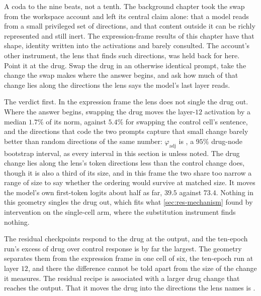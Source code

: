 
\begin{question}
A coda to the nine beats, not a tenth. The background chapter took the swap from
the workspace account and left its central claim alone: that a model reads from
a small privileged set of directions, and that content outside it can be richly
represented and still inert. The expression-frame results of this chapter have
that shape, identity written into the activations and barely consulted. The
account's other instrument, the lens that finds such directions, was held back
for here. Point it at the drug. Swap the drug in an otherwise
identical prompt, take the change the swap makes where the answer begins, and
ask how much of that change lies along the directions the lens says the model's
last layer reads.
\end{question}

\noindent
The verdict first. In the expression frame the lens does not single the drug
out. Where the answer begins, swapping the drug moves the layer-$12$ activation
by a median $1.7\%$ of its norm, against $5.4\%$ for swapping the control cell's
sentence, and the directions that code the two prompts capture that small change
barely better than random directions of the same number: $\varphi_{\textrm{adj}}$
is , a $95\%$ drug-node bootstrap interval, as
every interval in this section is unless noted. The drug change lies along the lens's token
directions less than the control change does, though it is also a third of its
size, and in this frame the two share too narrow a range of size to say whether
the ordering would survive at matched size. It moves the model's own first-token
logits about half as far, $39.5$ against $73.4$. Nothing in this geometry singles
the drug out, which fits what \cref{sec:res-mechanism} found by intervention on
the single-cell arm, where the substitution instrument finds nothing.

The residual checkpoints respond to the drug at the output, and the ten-epoch
run's excess of drug over control response is by far the largest. The geometry
separates them from the expression frame in one cell of six, the ten-epoch run
at layer $12$, and there the difference cannot be told apart from the size of
the change it measures. The residual recipe is associated with a larger drug
change that reaches the output. That it moves the drug into the directions the
lens names is \notestablished.

